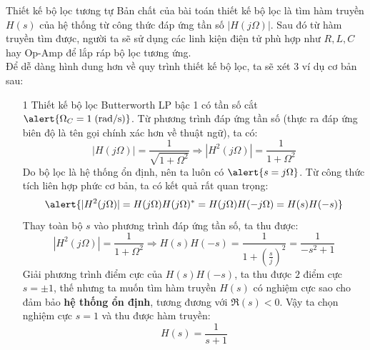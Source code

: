 \documentclass[8pt]{beamer}
\begin{document}
\begin{frame}{Thiết kế bộ lọc tương tự}
	Bản chất của bài toán thiết kế bộ lọc là tìm \alert{hàm truyền $H(s)$} của hệ thống từ công thức đáp ứng tần số $|H(j\Omega)|$. Sau đó từ hàm truyền tìm được, người ta sẽ sử dụng các linh kiện điện tử phù hợp như $R,L,C$ hay Op-Amp để lắp ráp bộ lọc tương ứng.
\\ Để dễ dàng hình dung hơn về quy trình thiết kế bộ lọc, ta sẽ xét 3 ví dụ cơ bản sau:
\begin{enumerate}
	\item[1] Thiết kế bộ lọc Butterworth LP bậc 1 có tần số cắt $\alert{\Omega_{C}=1\;\text{(rad/s)}}$.
Từ phương trình đáp ứng tần số (thực ra đáp ứng biên độ là tên gọi chính xác hơn về thuật ngữ), ta có:
$$|H(j\Omega)|=\frac{1}{\sqrt{1+\Omega^2}}\Rightarrow |H^2(j\Omega)|=\frac{1}{1+\Omega^2}$$
Do bộ lọc là hệ thống ổn định, nên ta luôn có $\alert{s=j\Omega}$. Từ công thức tích liên hợp phức cơ bản, ta có kết quả rất quan trọng: $$\alert{|H^2(j\Omega)|=H(j\Omega)H(j\Omega)^*=H(j\Omega)H(-j\Omega)=H(s)H(-s)}$$
Thay toàn bộ $s$ vào phương trình đáp ứng tần số, ta thu được:
$$|H^2(j\Omega)|=\frac{1}{1+\Omega^2}\Rightarrow H(s)H(-s)=\frac{1}{1+\left(\frac{s}{j}\right)^2}=\frac{1}{-s^2+1}$$
Giải phương trình điểm cực của $H(s)H(-s)$, ta thu được $2$ điểm cực $s=\pm 1$, thế nhưng ta muốn tìm \alert{hàm truyền $H(s)$} có nghiệm cực sao cho đảm bảo \textbf{hệ thống ổn định}, tương đương với $\Re{(s)}<0$. Vậy ta chọn nghiệm cực $s=1$ và thu được hàm truyền: $$H(s)=\frac{1}{s+1}$$
	\end{enumerate}

\end{frame}
\end{document}
